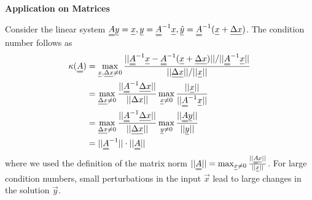 \textbf{Application on Matrices}\par
Consider the linear system $\mat{A}\vec{y}=\vec{x}, \vec{y} = \mat{A}^{-1}\vec{x}, \vec{\hat{y}} = \mat{A}^{-1}(\vec{x} + \vec{\Delta x})$. The condition number follows as
\begin{equation}
    \begin{aligned}
        \kappa(\mat{A}) &= \max_{\vec{x},\vec{\Delta x} \ne 0} \frac{||\mat{A}^{-1}\vec{x}-\mat{A}^{-1}(\vec{x} + \vec{\Delta x})|| / ||\mat{A}^{-1}\vec{x}||}{||\vec{\Delta x}|| / ||\vec{x}||} \\
                        &= \max_{\vec{\Delta x} \ne 0} \frac{||\mat{A}^{-1}\vec{\Delta x}||}{||\Delta x||} \max_{\vec{x} \ne 0} \frac{||\vec{x}||}{||\mat{A}^{-1}\vec{x}||} \\
                        &= \max_{\vec{\Delta x} \ne 0} \frac{||\mat{A}^{-1}\vec{\Delta x}||}{||\vec{\Delta x}||} \max_{\vec{y} \ne 0} \frac{||\mat{A}\vec{y}||}{||\vec{y}||} \\
                        &= ||\mat{A}^{-1}|| \cdot ||\mat{A}||
    \end{aligned}
\end{equation}
where we used the definition of the matrix norm $||\mat{A}|| = \max_{\vec{x} \ne 0} \frac{||\mat{A}\vec{x}||}{||\vec{x}||}$. For large condition numbers, small perturbations in the input $\vec{x}$ lead to
large changes in the solution $\vec{y}$.

\pagebreak